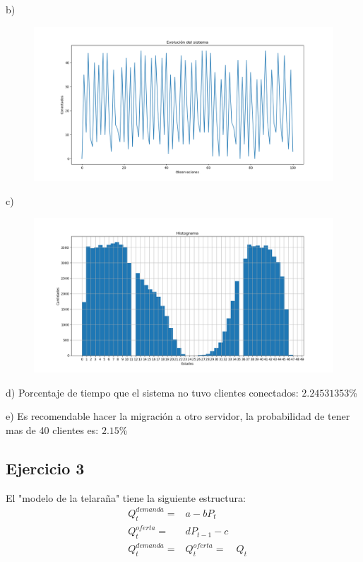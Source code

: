 \documentclass[11pt,a4paper]{article}
\begin{document}
		b)  
	     \begin{figure}[H]
  			\centering
    			\includegraphics[width=18cm]{imagenes/conectadosObservacionesEJ2}
		\end{figure}


		c)  
	     \begin{figure}[H]
  			\centering
    			\includegraphics[width=18cm]{imagenes/histogramaEj2}
		\end{figure}
		
		d) Porcentaje de tiempo que el sistema no tuvo clientes conectados: $2.24531353$\%
		
		e) Es recomendable hacer la migración a otro servidor, la probabilidad de tener mas de 40 clientes es: $2.15$\%

		
	\subsection{Ejercicio 3}
		El "modelo de la telaraña" tiene la siguiente estructura:
		\begin{equation}
			\begin{array}{llllll}
				&Q_t^{demanda} = & a - bP_t \\
				&Q_t^{oferta} = & dP_{t-1} - c \\
				&Q_t^{demanda} = &Q_t^{oferta}  = &Q_t
			\end{array}
		\end{equation}
		
\end{document}
